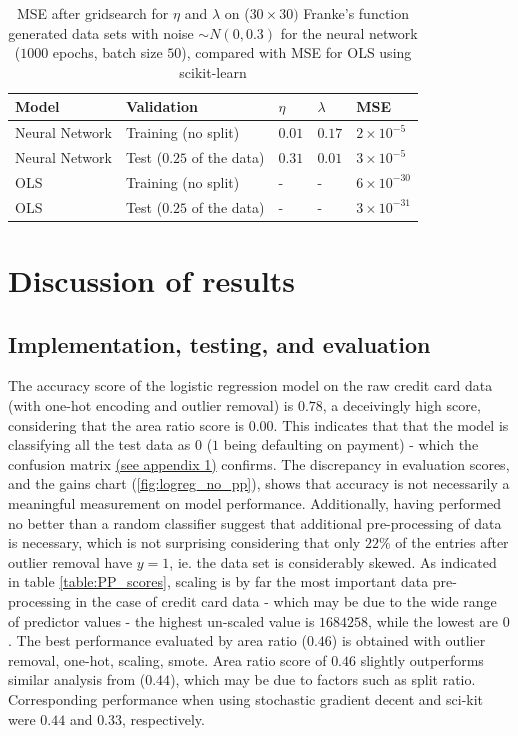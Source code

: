 \documentclass[%
oneside,                 %
final,                   %
10pt]{article}
\begin{document}
\begin{table}[h!]
\begin{center}
\begin{tabular}{lllll}
\hline
 Model & Validation & $\eta$  & $\lambda$  & MSE       \\
\hline
 Neural Network & Training (no split)   & $0.01$& $0.17$  & $2 \times 10^{-5}$ \\
 Neural Network & Test ($0.25$ of the data) & $0.31$& $0.01$  & $3 \times 10^{-5}$ \\
 OLS & Training (no split)   & - & -  & $6 \times 10^{-30}$\\
 OLS & Test ($0.25$ of the data)  & - & -  & $3 \times 10^{-31}$ \\
\hline
\end{tabular}
\end{center}
\caption{MSE after gridsearch for $\eta$ and $\lambda$ on ($30 \times 30)$ Franke's function generated data sets with noise $\sim N(0,0.3)$ for the neural network ($1000$ epochs, batch size $50$), compared with MSE for OLS using scikit-learn}
\label{table:mse_NN_p1}
\end{table}

\section{Discussion of results} \label{Section_Discussion_of_results}
\subsection{Implementation, testing, and evaluation}
The accuracy score of the logistic regression model on the raw credit card data (with one-hot encoding and outlier removal) is $0.78$, a deceivingly high score, considering that the area ratio score is $0.00$. This indicates that that the model is classifying all the test data as $0$ ($1$ being defaulting on payment) - which the confusion matrix  \hyperref[APP_1]{(see appendix 1)} confirms. The discrepancy in evaluation scores, and the gains chart (\ref{fig:logreg_no_pp}), shows that accuracy is not necessarily a meaningful measurement on model performance. Additionally, having performed no better than a random classifier suggest that additional pre-processing of data is necessary, which is not surprising considering that only $22\%$ of the entries after outlier removal have $y=1$, ie. the data set is considerably skewed. As indicated in table \ref{table:PP_scores}, scaling is by far the most important data pre-processing in the case of credit card data - which may be due to the wide range of predictor values - the highest un-scaled value is $1684258$, while the lowest are $0$. The best performance evaluated by area ratio ($0.46$) is obtained with outlier removal, one-hot, scaling, smote. Area ratio score of $0.46$ slightly outperforms similar analysis from \cite{YCCC} ($0.44$), which may be due to factors such as split ratio. Corresponding performance when using stochastic gradient decent and sci-kit were $0.44$ and $0.33$, respectively. 
\end{document}
